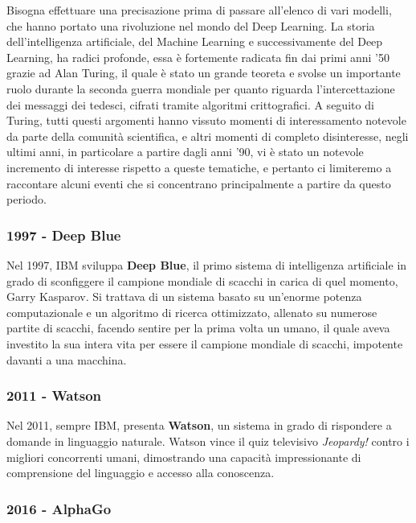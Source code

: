Bisogna effettuare una precisazione prima di passare all'elenco di vari modelli, che hanno portato una rivoluzione nel mondo del Deep Learning. La storia dell'intelligenza artificiale, del Machine Learning e successivamente del Deep Learning, ha radici profonde, essa è fortemente radicata fin dai primi anni '50 grazie ad Alan Turing, il quale è stato un grande teoreta e svolse un importante ruolo durante la seconda guerra mondiale per quanto riguarda l'intercettazione dei messaggi dei tedesci, cifrati tramite algoritmi crittografici. A seguito di Turing, tutti questi argomenti hanno vissuto momenti di interessamento notevole da parte della comunità scientifica, e altri momenti di completo disinteresse, negli ultimi anni, in particolare a partire dagli anni '90, vi è stato un notevole incremento di interesse rispetto a queste tematiche, e pertanto ci limiteremo a raccontare alcuni eventi che si concentrano principalmente a partire da questo periodo.

\subsubsection{1997 - Deep Blue}

Nel 1997, IBM sviluppa \textbf{Deep Blue}, il primo sistema di intelligenza artificiale in grado di sconfiggere il campione mondiale di scacchi in carica di quel momento, Garry Kasparov. Si trattava di un sistema basato su un’enorme potenza computazionale e un algoritmo di ricerca ottimizzato, allenato su numerose partite di scacchi, facendo sentire per la prima volta un umano, il quale aveva investito la sua intera vita per essere il campione mondiale di scacchi, impotente davanti a una macchina.

\subsubsection{2011 - Watson}

Nel 2011, sempre IBM, presenta \textbf{Watson}, un sistema in grado di rispondere a domande in linguaggio naturale. Watson vince il quiz televisivo \emph{Jeopardy!} contro i migliori concorrenti umani, dimostrando una capacità impressionante di comprensione del linguaggio e accesso alla conoscenza.

\subsubsection{2016 - AlphaGo}

